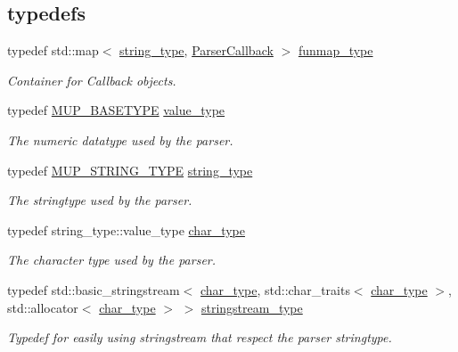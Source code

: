 \subsection*{\textquotesingle{}typedefs\textquotesingle{}}
\begin{DoxyCompactItemize}
\item 
typedef std\+::map$<$ \hyperlink{namespacemu_ae9f8b44d9a97dd397180891e8390c3e9}{string\+\_\+type}, \hyperlink{classmu_1_1_parser_callback}{Parser\+Callback} $>$ \hyperlink{namespacemu_aa38fb627ca71e44a49de0f2fe4d9031d}{funmap\+\_\+type}
\begin{DoxyCompactList}\small\item\em Container for Callback objects. \end{DoxyCompactList}\item 
typedef \hyperlink{mu_parser_def_8h_a5a22a812cf29b119506daad01152f93a}{M\+U\+P\+\_\+\+B\+A\+S\+E\+T\+Y\+PE} \hyperlink{namespacemu_a17d4f113a4b88b8d971cca8ddbbe8a47}{value\+\_\+type}
\begin{DoxyCompactList}\small\item\em The numeric datatype used by the parser. \end{DoxyCompactList}\item 
typedef \hyperlink{mu_parser_def_8h_a1fc7b0394571c5a372932693798ba658}{M\+U\+P\+\_\+\+S\+T\+R\+I\+N\+G\+\_\+\+T\+Y\+PE} \hyperlink{namespacemu_ae9f8b44d9a97dd397180891e8390c3e9}{string\+\_\+type}
\begin{DoxyCompactList}\small\item\em The stringtype used by the parser. \end{DoxyCompactList}\item 
typedef string\+\_\+type\+::value\+\_\+type \hyperlink{namespacemu_a81cc89a81a8872430ab1799b5848c5ca}{char\+\_\+type}
\begin{DoxyCompactList}\small\item\em The character type used by the parser. \end{DoxyCompactList}\item 
typedef std\+::basic\+\_\+stringstream$<$ \hyperlink{namespacemu_a81cc89a81a8872430ab1799b5848c5ca}{char\+\_\+type}, std\+::char\+\_\+traits$<$ \hyperlink{namespacemu_a81cc89a81a8872430ab1799b5848c5ca}{char\+\_\+type} $>$, std\+::allocator$<$ \hyperlink{namespacemu_a81cc89a81a8872430ab1799b5848c5ca}{char\+\_\+type} $>$ $>$ \hyperlink{namespacemu_ab3b60f8311eb24cf437182a8d5125774}{stringstream\+\_\+type}
\begin{DoxyCompactList}\small\item\em Typedef for easily using stringstream that respect the parser stringtype. \end{DoxyCompactList}\item 

\end{DoxyCompactItemize}
